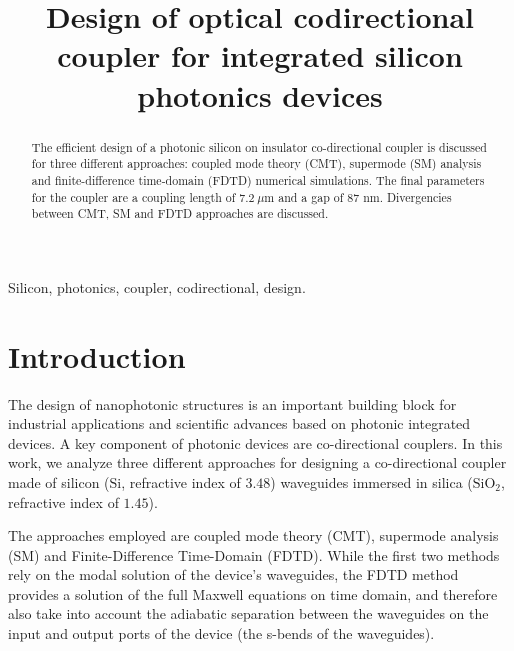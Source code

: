 \documentclass[conference]{IEEEtran}
\begin{document}
\title{Design of optical codirectional coupler for integrated silicon photonics devices}

\author{
}

\maketitle

\begin{abstract}
The efficient design of a photonic silicon on insulator co-directional coupler is discussed for three different approaches: coupled mode theory (CMT), supermode (SM) analysis and finite-difference time-domain (FDTD) numerical simulations. The final parameters for the coupler are  a coupling length of $7.2\ \mu\text{m}$ and a gap of $87$ nm. Divergencies between CMT, SM and FDTD approaches are discussed. 
\end{abstract}

\begin{IEEEkeywords}
Silicon, photonics, coupler, codirectional, design.
\end{IEEEkeywords}

\section{Introduction}
The design of nanophotonic structures is an important building block for industrial applications and scientific advances based on photonic integrated devices. A key component of photonic devices are co-directional couplers. In this work, we analyze three different approaches for designing a co-directional coupler made of silicon ($\text{Si}$, refractive index of $3.48$) waveguides immersed in silica ($\text{SiO}_2$, refractive index of $1.45$). 

The approaches employed are coupled mode theory (CMT), supermode analysis (SM) and Finite-Difference Time-Domain (FDTD). While the first two methods rely on the modal solution of the device's waveguides, the FDTD method provides a solution of the full Maxwell equations on time domain, and therefore also take into account the adiabatic separation between the waveguides on the input and output ports of the device (the s-bends of the waveguides).
\end{document}
